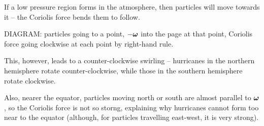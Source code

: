 \documentclass{../../template/note}
\begin{document}
    \begin{example*}
        If a low pressure region forms in the atmosphere, then particles will move towards it -- the Coriolis force bends them to follow.

        DIAGRAM: particles going to a point, \(-\V \omega\) into the page at that point, Coriolis force going clockwise at each point by right-hand rule.

        This, however, leads to a counter-clockwise swirling -- hurricanes in the northern hemisphere rotate counter-clockwise, while those in the southern hemisphere rotate clockwise.

        Also, nearer the equator, particles moving north or south are almost parallel to \(\V \omega\), so the Coriolis force is not so storng, explaining why hurricanes cannot form too near to the equator (although, for particles travelling east-west, it is very strong).
    \end{example*}
    
\end{document}
